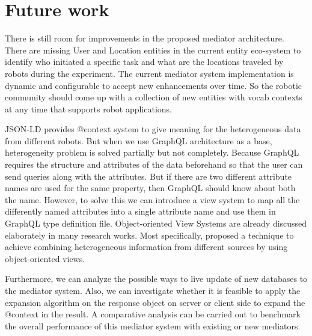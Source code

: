 \section{Future work}
There is still room for improvements in the proposed mediator architecture. 
There are missing User and Location entities in the current entity eco-system to identify who initiated a specific task and what are the locations traveled by robots during the experiment. The current mediator system implementation is dynamic and configurable to accept new enhancements over time. So the robotic community should come up with a collection of new entities with vocab contexts at any time that supports robot applications.

JSON-LD provides @context system to give meaning for the heterogeneous data from different robots. But when we use GraphQL architecture as a base, heterogeneity problem is solved partially but not completely. Because GraphQL requires the structure and attributes of the data beforehand so that the user can send queries along with the attributes. But if there are two different attribute names are used for the same property, then GraphQL should know about both the name. However, to solve this we can introduce a view system to map all the differently named attributes into a single attribute name and use them in GraphQL type definition file. Object-oriented View Systems are already discussed elaborately in many research works. Most specifically, \citet{kaul1990viewsystem} proposed a technique to achieve combining heterogeneous information from different sources by using object-oriented views. 

Furthermore, we can analyze the possible ways to live update of new databases to the mediator system. Also, we can investigate whether it is feasible to apply the expansion algorithm on the response object on server or client side to expand the @context in the result. A comparative analysis can be carried out to benchmark the overall performance of this mediator system with existing or new mediators.


